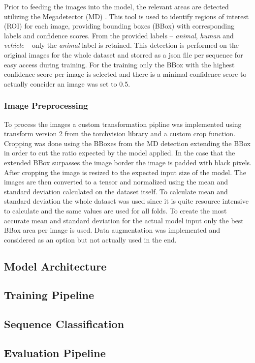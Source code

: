         Prior to feeding the images into the model, the relevant areas are detected utilizing the Megadetector (MD) \autocite{morrisEfficientPipelineCamera2025}. 
        This tool is used to identify regions of interest (ROI) for each image, providing bounding boxes (BBox) with corresponding labels and confidence scores.
        From the provided labels -- \textit{animal}, \textit{human} and \textit{vehicle} -- only the \textit{animal} label is retained.
        This detection is performed on the original images for the whole dataset and storred as a json file per sequence for easy access during training.
        For the training only the BBox with the highest confidence score per image is selected and there is a minimal confidence score to actually concider an image was set to 0.5.
        

        \subsubsection{Image Preprocessing}
        To process the images a custom transformation pipline was implemented using transform version 2 from the torchvision library and a custom crop function.
        Cropping was done using the BBoxes from the MD detection extending the BBox in order to cut the ratio expected by the model applied.
        In the case that the extended BBox surpasses the image border the image is padded with black pixels.
        After cropping the image is resized to the expected input size of the model.
        The images are then converted to a tensor and normalized using the mean and standard deviation calculated on the dataset itself.
        To calculate mean and standard deviation the whole dataset was used since it is quite resource intensive to calculate and the same values are used for all folds.
        To create the most accurate mean and standard deviation for the actual model input only the best BBox area per image is used.
        Data augmentation was implemented and considered as an option but not actually used in the end.

        \subsection{Model Architecture}

        \subsection{Training Pipeline}

        \subsection{Sequence Classification}

        \subsection{Evaluation Pipeline}
